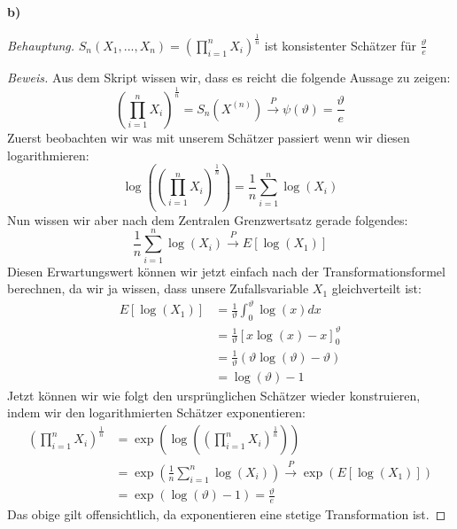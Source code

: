 \documentclass[a4paper]{article}
\newcommand{\beh}{\textit{Behauptung. }}
\begin{document}
\begin{theorem} %
\textbf{b)}

\beh $S_n (X_1, ..., X_{n}) = \left(
	\prod_{i=1}^{n} X_{i}
\right) ^{\frac{ 1 }{ n }} $ ist konsistenter Schätzer
für $\frac{ \vartheta }{ e }$ 

\begin{proof}[Beweis]
	Aus dem Skript wissen wir, dass es reicht die folgende Aussage zu zeigen:
	\[
		\left(
			\prod_{i=1}^{n} X_{i}
		\right) ^{\frac{ 1 }{ n }} 
		= S_n (X ^{(n)}) \overset{P}
		\to \psi(\vartheta) = \frac{ \vartheta }{ e }
	\] 
	Zuerst beobachten wir was mit unserem Schätzer passiert wenn wir diesen
	logarithmieren:
	\[
		\log \left(
			\left(
				\prod_{i=1}^{n} X_{i}
			\right) ^{\frac{ 1 }{ n }} 
		\right) =
			\frac{ 1 }{ n }
			\sum_{i=1}^{n} \log(X_i)
	\] 
	Nun wissen wir aber nach dem Zentralen Grenzwertsatz gerade folgendes:
	\[
		\frac{ 1 }{ n } \sum_{i=1}^{n} \log(X_i)
		\overset{P} \to E \left[
			\log(X_1)
		\right] 
	\] 
	Diesen Erwartungswert können wir jetzt einfach nach der Transformationsformel
	berechnen, da wir ja wissen, dass unsere Zufallsvariable $X_1$ gleichverteilt ist:
	\begin{align*}
		E \left[
			\log(X_1)
		\right] &= \frac{ 1 }{ \vartheta }
		\int_{0}^{\vartheta} \log(x) dx \\
				&= \frac{ 1 }{ \vartheta }  \left[
					x \log(x) - x
				\right]_0 ^{\vartheta} \\
				&= \frac{ 1 }{ \vartheta } \left(
					\vartheta \log ( \vartheta ) - \vartheta
				\right) \\
				&= \log(\vartheta) - 1
	\end{align*}
	Jetzt können wir wie folgt den ursprünglichen Schätzer wieder konstruieren, indem
	wir den logarithmierten Schätzer exponentieren:
	\begin{align*}
		\left(
			\prod_{i=1}^{n} X_{i}
		\right) ^{\frac{ 1 }{ n }} &=
		\exp 
			\left(
				\log 
				\left(
					\left(
						\prod_{i=1}^{n} X_{i}
					\right) ^{\frac{ 1 }{ n }} 
				\right) 
			\right) \\
								   &=
		\exp \left(
			\frac{ 1 }{ n } \sum_{i=1}^{n} \log(X_i)
		\right) \overset{P} \to \exp(
			E \left[
				\log(X_1)
			\right] 
		) \\
								   &=
			\exp (\log (\vartheta) - 1) 
			= \frac{ \vartheta }{ e }
	\end{align*}
	Das obige gilt offensichtlich, da exponentieren eine stetige Transformation ist.
\end{proof}
\end{theorem}
\end{document}
